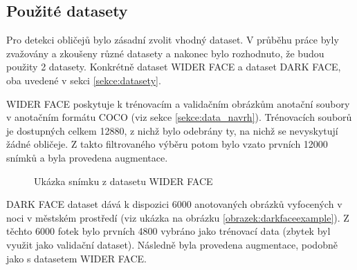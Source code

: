 \subsection*{Použité datasety}
Pro detekci obličejů bylo zásadní zvolit vhodný dataset. V průběhu práce byly zvažovány a zkoušeny různé datasety a nakonec bylo rozhodnuto, že budou použity 2 datasety. Konkrétně dataset WIDER FACE a dataset DARK FACE, oba uvedené v sekci \ref{sekce:datasety}.

WIDER FACE poskytuje k trénovacím a validačním obrázkům anotační soubory v anotačním formátu COCO (viz sekce \ref{sekce:data_navrh}). Trénovacích souborů je dostupných celkem 12880, z nichž bylo odebrány ty, na nichž se nevyskytují žádné obličeje. Z takto filtrovaného výběru potom bylo vzato prvních 12000 snímků a byla provedena augmentace.

\begin{figure}[H]
  \begin{center}
  \label{obrazek:widerfaceexample}
  \caption{Ukázka snímku z datasetu WIDER FACE}
  \end{center}
\end{figure}

DARK FACE dataset dává k dispozici 6000 anotovaných obrázků vyfocených v noci v městském prostředí (viz ukázka na obrázku \ref{obrazek:darkfaceexample}). Z těchto 6000 fotek bylo prvních 4800 vybráno jako trénovací data (zbytek byl využit jako validační dataset). Následně byla provedena augmentace, podobně jako s datasetem WIDER FACE.

